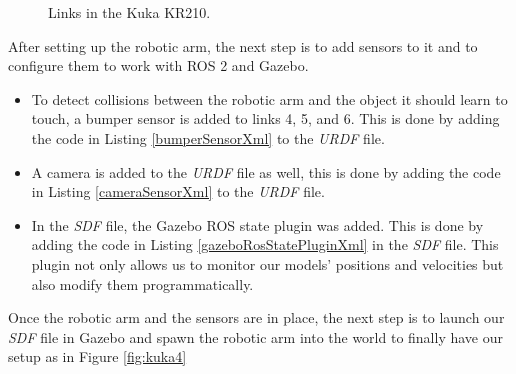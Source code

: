 \documentclass[12pt,oneside]{article}
\begin{document}
\begin{figure}[H]
  \centering
  \hfill
  \caption{Links in the Kuka KR210.}
\end{figure}

After setting up the robotic arm, the next step is to add sensors to it and to configure them to work with ROS 2 and Gazebo.
\begin{itemize}
\item To detect collisions between the robotic arm and the object it should learn to touch, a bumper sensor is added to links 4, 5, and 6. This is done by adding the code in Listing \ref{bumperSensorXml} to the \textit{URDF} file.

\item A camera is added to the \textit{URDF} file as well, this is done by adding the code in Listing \ref{cameraSensorXml} to the \textit{URDF} file.

\item In the \textit{SDF} file, the Gazebo ROS state plugin was added. This is done by adding the code in Listing \ref{gazeboRosStatePluginXml} in the \textit{SDF} file. This plugin not only allows us to monitor our models' positions and velocities but also modify them programmatically.
\end{itemize}

Once the robotic arm and the sensors are in place, the next step is to launch our \textit{SDF} file in Gazebo and spawn the robotic arm into the world to finally have our setup as in Figure \ref{fig:kuka4}
\end{document}
